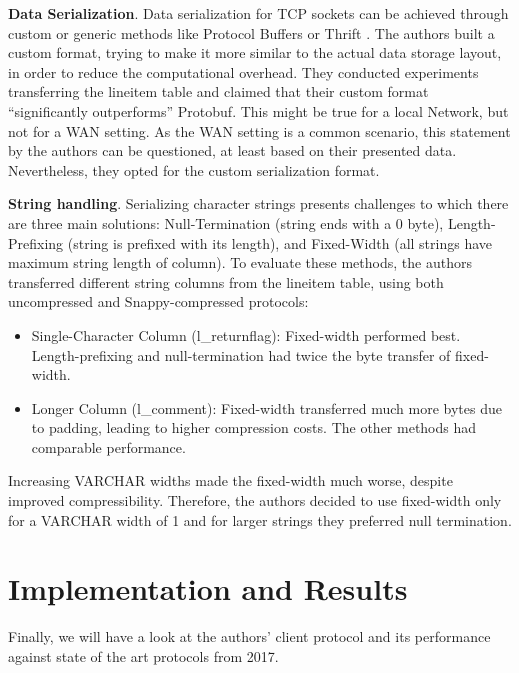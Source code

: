 \documentclass[sigconf]{acmart}
\begin{document}
\textbf{Data Serialization}.
Data serialization for TCP sockets can be achieved through custom or generic methods like Protocol Buffers \cite{protobuf2016developers} or Thrift \cite{prunicki2009apache}. The authors built a custom format, trying to make it more similar to the actual data storage layout, in order to reduce the computational overhead.
They conducted experiments transferring the lineitem table and claimed that their custom format “significantly outperforms” Protobuf. This might be true for a local Network, but not for a WAN setting. As the WAN setting is a common scenario, this statement by the authors can be questioned, at least based on their presented data. Nevertheless, they opted for the custom serialization format.

\textbf{String handling}.
Serializing character strings presents challenges to which there are three main solutions: Null-Termination (string ends with a 0 byte), Length-Prefixing (string is prefixed with its length), and Fixed-Width (all strings have maximum string length of column). To evaluate these methods, the authors transferred different string columns from the lineitem table, using both uncompressed and Snappy-compressed protocols:
\begin{itemize}
    \item Single-Character Column (l\_returnflag): Fixed-width performed best. Length-prefixing and null-termination had twice the byte transfer of fixed-width.
    \item Longer Column (l\_comment): Fixed-width transferred much more bytes due to padding, leading to higher compression costs. The other methods had comparable performance.
\end{itemize}

Increasing VARCHAR widths made the fixed-width much worse, despite improved compressibility. Therefore, the authors decided to use fixed-width only for a VARCHAR width of 1 and for larger strings they preferred null termination.


\section{Implementation and Results}
Finally, we will have a look at the authors’ client protocol and its performance against state of the art protocols from 2017. 
\end{document}
